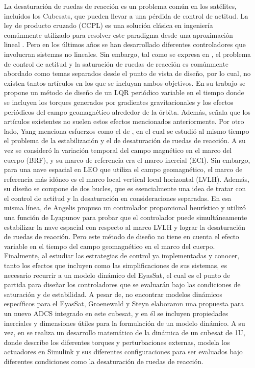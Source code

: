 La desaturación de ruedas de reacción es un problema común en los satélites, incluidos los Cubesats, que pueden llevar a una pérdida de control de actitud. La ley de producto cruzado (CCPL) es una solución clásica en ingeniería comúnmente utilizado para resolver este paradigma desde una aproximación lineal \cite{Tregouet2015}. Pero en los últimos años se han desarrollado diferentes controladores que involucran sistemas no lineales.
Sin embargo, tal como se expresa en \cite{Yang2017}, el problema de control de actitud y la saturación de ruedas de reacción es comúnmente abordado como temas separados desde el punto de vista de diseño, por lo cual, no existen tantos artículos en los que se incluyan ambos objetivos. En su trabajo se propone un método de diseño de un LQR periódico variable en el tiempo donde se incluyen los torques generados por gradientes gravitacionales y los efectos periódicos del campo geomagnético alrededor de la órbita. Además, señala que los artículos existentes no suelen estos efectos mencionados anteriormente.
Por otro lado, Yang menciona esfuerzos como el de \cite{Tregouet2015} , en el cual se estudió al mismo tiempo el problema de la estabilización y el de desaturación de ruedas de reacción. A su vez se consideró la variación temporal del campo magnético en el marco del cuerpo (BRF), y su marco de referencia era el marco inercial (ECI). Sin embargo, para una nave espacial en LEO que utiliza el campo geomagnético, el marco de referencia más idóneo es el marco local vertical local horizontal (LVLH). Además, su diseño se compone de dos bucles, que es esencialmente una idea de tratar con el control de actitud y la desaturación en consideraciones separadas.
En esa misma línea, de Angelis \cite{Angelis2016} propuso un controlador proporcional heurístico y utilizó una función de Lyapunov para probar que el controlador puede simultáneamente estabilizar la nave espacial con respecto al marco LVLH y lograr la desaturación de ruedas de reacción. Pero este método de diseño no tiene en cuenta el efecto variable en el tiempo del campo geomagnético en el marco del cuerpo.
Finalmente, al estudiar las estrategias de control ya implementadas y conocer, tanto los efectos que incluyen como las simplificaciones de sus sistemas, es necesario recurrir a un modelo dinámico del EyasSat, el cual es el punto de partida para diseñar los controladores que se evaluarán bajo las condiciones de saturación y de estabilidad. A pesar de, no encontrar modelos dinámicos específicos para el EyasSat, Groenewald y Steyn \cite{Groenewald2014} elaboraron una propuesta para un nuevo ADCS integrado en este cubesat, y en él se incluyen propiedades inerciales y dimensiones útiles para la formulación de un modelo dinámico.
A su vez, en \cite{tes:Sorolla2019} se realiza un desarrollo matemático de la dinámica de un cubesat de 1U, donde describe los diferentes torques y perturbaciones externas, modela los actuadores en Simulink y sus diferentes configuraciones para ser evaluados bajo diferentes condiciones como la desaturación de ruedas de reacción.


